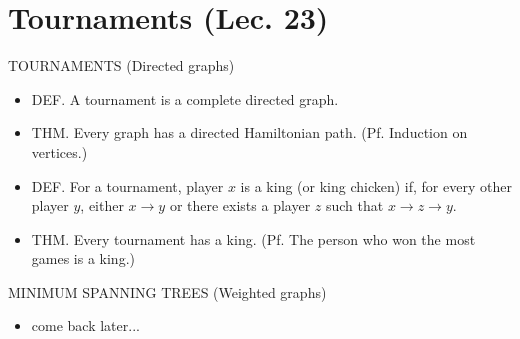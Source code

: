 \documentclass[../m55main.tex]{subfiles}
\begin{document}
\section{Tournaments (Lec. 23)}
TOURNAMENTS (Directed graphs)
\begin{itemize}
    \item DEF. A tournament is a complete directed graph.
    \item THM. Every graph has a directed Hamiltonian path. (Pf. Induction on vertices.)
    \item DEF. For a tournament, player $x$ is a king (or king chicken) if, for every other player $y$, either $x \to y$ or there exists a player $z$ such that $x \to z \to y$.
    \item THM. Every tournament has a king. (Pf. The person who won the most games is a king.)
\end{itemize}
MINIMUM SPANNING TREES (Weighted graphs)
\begin{itemize}
    \item come back later...
\end{itemize}
\end{document}
